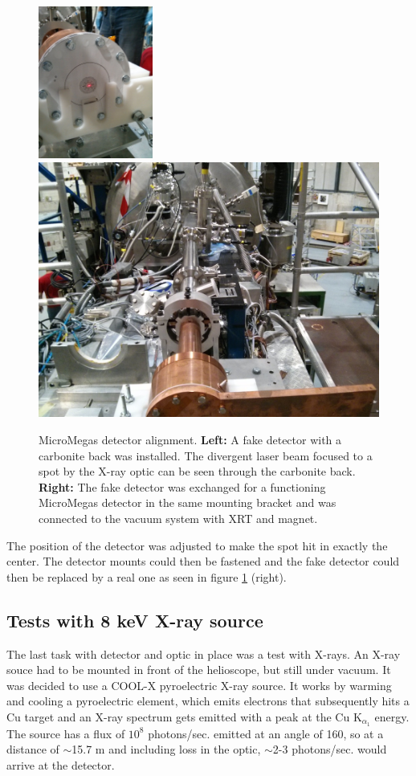 \begin{figure}[htbp]
  \centering
    \includegraphics[height=5cm]{figures/cast/castxrt_alignment1.jpg}
    \hspace{20pt}
    \includegraphics[width=0.45\linewidth]{figures/cast/castxrt_alignment2.jpg}
  \caption{\footnotesize MicroMegas detector alignment. \textbf{Left:} A fake detector with a carbonite back was installed. The divergent laser beam focused to a spot by the X-ray optic can be seen through the carbonite back. \textbf{Right:} The fake detector was exchanged for a functioning MicroMegas detector in the same mounting bracket and was connected to the vacuum system with XRT and magnet.}
  \label{fig:cast_align}
\end{figure}

The position of the detector was adjusted to make the spot hit in exactly the center. The detector mounts could then be fastened and the fake detector could then be replaced by a real one as seen in figure \ref{fig:cast_align} (right).

\subsection{Tests with 8 keV X-ray source}
The last task with detector and optic in place was a test with X-rays. An X-ray souce had to be mounted in front of the helioscope, but still under vacuum. It was decided to use a COOL-X pyroelectric X-ray source. It works by warming and cooling a pyroelectric element, which emits electrons that subsequently hits a Cu target and an X-ray spectrum gets emitted with a peak at the Cu K$_{\alpha_1}$ energy. The source has a flux of $10^8$ photons/sec. emitted at an angle of 160\degr, so at a distance of $\sim$15.7 m and including loss in the optic, $\sim$2-3 photons/sec. would arrive at the detector.

